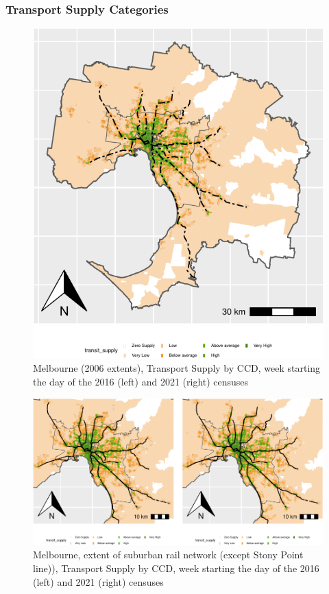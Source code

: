 \documentclass[preprint, 3p,
authoryear]{elsarticle} %
\begin{document}
\hypertarget{transport-supply-categories}{%
\subsubsection{Transport Supply
Categories}\label{transport-supply-categories}}

\begin{figure}
\includegraphics[width=1\linewidth]{Leveraging_GTFS_to_assess_transit_supply_Transport_Geography_files/figure-latex/Greater_Melbourne_CCD_2021-1} \caption{Melbourne (2006 extents), Transport Supply by CCD, week starting the day of the 2016 (left) and 2021 (right) censuses}\label{fig:Greater_Melbourne_CCD_2021}
\end{figure}

\begin{figure}
\includegraphics[width=1\linewidth]{Leveraging_GTFS_to_assess_transit_supply_Transport_Geography_files/figure-latex/Greater_Melbourne_CCD_2021_rail_extents-1} \caption{Melbourne, extent of suburban rail network (except Stony Point line)), Transport Supply by CCD, week starting the day of the 2016 (left) and 2021 (right) censuses}\label{fig:Greater_Melbourne_CCD_2021_rail_extents}
\end{figure}
\end{document}

